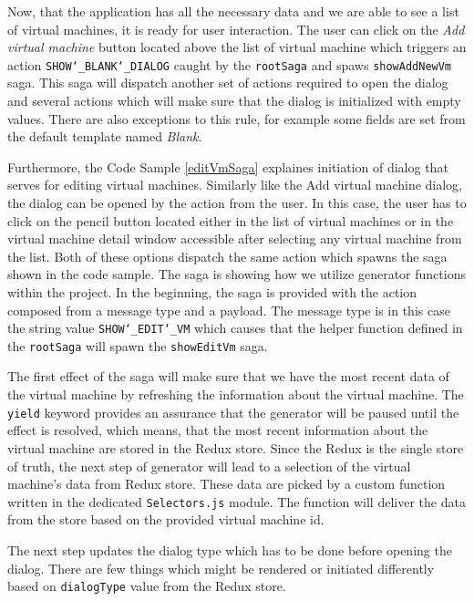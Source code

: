 Now, that the application has all the necessary data and we are able to see a list of virtual machines, it is ready for user interaction. The user can click on the \textit{Add virtual machine} button located above the list of virtual machine which triggers an action \texttt{SHOW\char`_BLANK\char`_DIALOG} caught by the \texttt{rootSaga} and spaws \texttt{showAddNewVm} saga. This saga will dispatch another set of actions required to open the dialog and several actions which will make sure that the dialog is initialized with empty values. There are also exceptions to this rule, for example some fields are set from the default template named \textit{Blank}. 

Furthermore, the Code Sample \ref{editVmSaga} explaines initiation of dialog that serves for editing virtual machines. Similarly like the Add virtual machine dialog, the dialog can be opened by the action from the user. In this case, the user has to click on the pencil button located either in the list of virtual machines or in the virtual machine detail window accessible after selecting any virtual machine from the list. Both of these options dispatch the same action which spawns the saga shown in the code sample. The saga is showing how we utilize generator functions within the project. In the beginning, the saga is provided with the action composed from a message type and a payload. The message type is in this case the string value \texttt{SHOW\char`_EDIT\char`_VM} which causes that the helper function defined in the \texttt{rootSaga} will spawn the \texttt{showEditVm} saga. 

The first effect of the saga will make sure that we have the most recent data of the virtual machine by refreshing the information about the virtual machine. The \texttt{yield} keyword provides an assurance that the generator will be paused until the effect is resolved, which means, that the most recent information about the virtual machine are stored in the Redux store. Since the Redux is the single store of truth, the next step of generator will lead to a selection of the virtual machine's data from Redux store. These data are picked by a custom function written in the dedicated \texttt{Selectors.js} module. The function will deliver the data from the store based on the provided virtual machine id.

The next step updates the dialog type which has to be done before opening the dialog. There are few things which might be rendered or initiated differently based on \texttt{dialogType} value from the Redux store.

